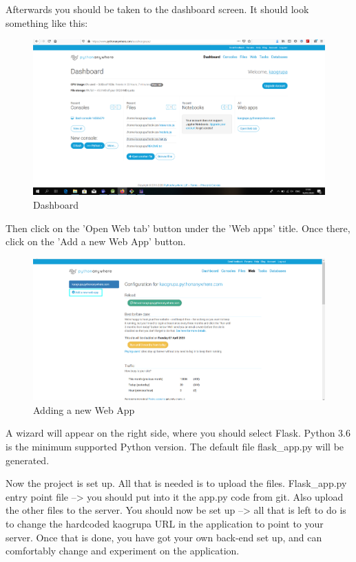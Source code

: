 				Afterwards you should be taken to the dashboard screen. It should look something like this:
				\begin{figure}[H]
					\includegraphics[width=\linewidth]{images/Deploy_2.png}
					\caption{Dashboard}
					\label{fig:deployment_2}
				\end{figure}
				
				Then click on the 'Open Web tab' button under the 'Web apps' title. Once there, click on the 'Add a new Web App' button.
				\begin{figure}[H]
					\includegraphics[width=\linewidth]{images/Deploy_3.png}
					\caption{Adding a new Web App}
					\label{fig:deployment_3}
				\end{figure}
				
				A wizard will appear on the right side, where you should select Flask. Python 3.6 is the minimum supported Python version. The default file flask\_app.py will be generated. 
				
				Now the project is set up. All that is needed is to upload the files. Flask\_app.py entry point file --> you should put into it the app.py code from git. Also upload the other files to the server. You should now be set up --> all that is left to do is to change the hardcoded kaogrupa URL in the application to point to your server. Once that is done, you have got your own back-end set up, and can comfortably change and experiment on the application.
				
